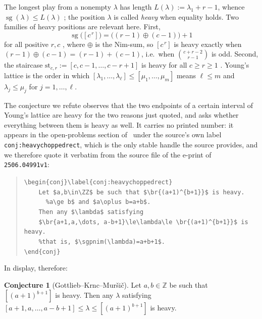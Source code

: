\documentclass[11pt]{amsart}
\theoremstyle{definition}
\newtheorem{conjecture}[theorem]{Conjecture}
\theoremstyle{remark}
\newcommand{\br}[1]{[#1]}
\newcommand{\sgv}{\operatorname{sg}}
\newcommand{\str}{\mathrm{st}}
\begin{document}
The longest play from a nonempty $\lambda$ has length
$L(\lambda):=\lambda_1+r-1$, whence $\sgv(\lambda)\le L(\lambda)$
\cite[Prop.~2.6]{GKM}; the position $\lambda$ is called \emph{heavy} when
equality holds. Two families of heavy positions are relevant here. First,
\begin{equation}\label{eq:rect}
  \sgv\bigl(\br{c^{\,r}}\bigr)=\bigl((r-1)\oplus(c-1)\bigr)+1
\end{equation}
for all positive $r,c$ \cite[Thm.~1.1]{GKM}, where $\oplus$ is the Nim-sum, so
$\br{c^{\,r}}$ is heavy exactly when $(r-1)\oplus(c-1)=(r-1)+(c-1)$, i.e.\
when $\binom{c+r-2}{r-1}$ is odd. Second, the staircase
$\str_{c,r}:=\br{c,c-1,\dots,c-r+1}$ is heavy for all $c\ge r\ge1$
\cite[Prop.~4.4]{GKM}. Young's lattice is the order in which
$\br{\lambda_1,\dots,\lambda_\ell}\le\br{\mu_1,\dots,\mu_m}$ means
$\ell\le m$ and $\lambda_j\le\mu_j$ for $j=1,\dots,\ell$.

The conjecture we refute observes that the two endpoints of a certain interval
of Young's lattice are heavy for the two reasons just quoted, and asks whether
everything between them is heavy as well. It carries no printed number: it
appears in the open-problems section of~\cite{GKM} under the source's own
label \texttt{conj:heavychoppedrect}, which is the only stable handle the
source provides, and we therefore quote it verbatim from the source file of the
e-print of \texttt{2506.04991v1}:

\begin{quote}\ttfamily\small
\begin{tabbing}
\verb|\begin{conj}\label{conj:heavychoppedrect}|\\
\verb|    Let $a,b\in\ZZ$ be such that $\br{(a+1)^{b+1}}$ is heavy.|\\
\verb|      %a\ge b$ and $a\oplus b=a+b$. |\\
\verb|    Then any $\lambda$ satisfying|\\
\verb|    $\br{a+1,a,\dots, a-b+1}\le\lambda\le \br{(a+1)^{b+1}}$ is heavy.|\\
\verb|    %that is, $\sgpnim(\lambda)=a+b+1$.|\\
\verb|\end{conj}|
\end{tabbing}
\end{quote}

\noindent In display, therefore:

\begin{conjecture}[Gottlieb--Krnc--Mur\v{s}i\v{c}]\label{conj:target}
Let $a,b\in\mathbb Z$ be such that $\br{(a+1)^{b+1}}$ is heavy. Then any
$\lambda$ satisfying
$\br{a+1,a,\dots,a-b+1}\le\lambda\le\br{(a+1)^{b+1}}$ is heavy.
\end{conjecture}
\end{document}
